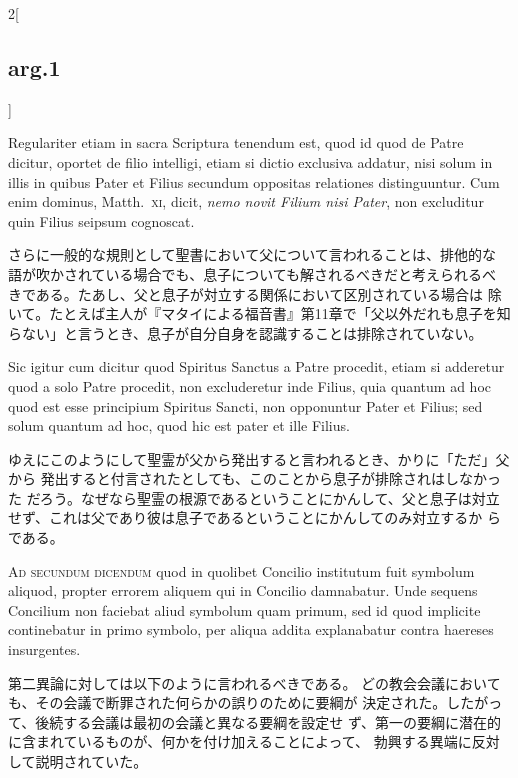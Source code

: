 \documentclass[paper=a4paper,fontsize=10pt,jafontsize=9pt,titlepage]{jlreq}
\begin{document}
\begin{paracol}{2}[\subsection{arg.1}]
\switchcolumn*

Regulariter etiam in sacra
Scriptura tenendum est, quod id quod de Patre dicitur, oportet de
filio intelligi, etiam si dictio exclusiva addatur, nisi solum in
illis in quibus Pater et Filius secundum oppositas relationes
distinguuntur. Cum enim dominus, Matth.~{\scshape xi}, dicit, {\itshape nemo novit Filium
nisi Pater}, non excluditur quin Filius seipsum cognoscat.

\switchcolumn

さらに一般的な規則として聖書において父について言われることは、排他的な
語が吹かされている場合でも、息子についても解されるべきだと考えられるべ
 きである。たあし、父と息子が対立する関係において区別されている場合は
 除いて。たとえば主人が『マタイによる福音書』第11章で「父以外だれも息子を知
 らない」と言うとき、息子が自分自身を認識することは排除されていない。

\switchcolumn*

Sic igitur
cum dicitur quod Spiritus Sanctus a Patre procedit, etiam
si adderetur quod a solo Patre procedit, non excluderetur inde Filius,
quia quantum ad hoc quod est esse principium  Spiritus Sancti, non
opponuntur Pater et Filius; sed solum quantum ad hoc, quod hic est
pater et ille Filius.

\switchcolumn

ゆえにこのようにして聖霊が父から発出すると言われるとき、かりに「ただ」父から
 発出すると付言されたとしても、このことから息子が排除されはしなかった
 だろう。なぜなら聖霊の根源であるということにかんして、父と息子は対立
 せず、これは父であり彼は息子であるということにかんしてのみ対立するか
 らである。

\switchcolumn*[\subsection{ad.2}]

{\scshape Ad secundum dicendum} quod in quolibet Concilio institutum fuit
symbolum aliquod, propter errorem aliquem qui in Concilio
damnabatur. Unde sequens Concilium non faciebat aliud symbolum quam
primum, sed id quod implicite continebatur in primo symbolo, per
aliqua addita explanabatur contra haereses insurgentes.

\switchcolumn

第二異論に対しては以下のように言われるべきである。
どの教会会議においても、その会議で断罪された何らかの誤りのために要綱が
 決定された。したがって、後続する会議は最初の会議と異なる要綱を設定せ
 ず、第一の要綱に潜在的に含まれているものが、何かを付け加えることによって、
 勃興する異端に反対して説明されていた。


\end{paracol}
\end{document}
